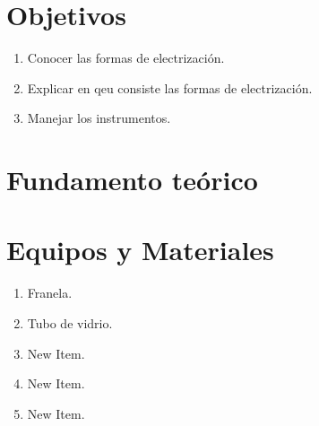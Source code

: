 \begin{center}
	\underline{\Large\scshape\bfseries \dytema}
\end{center}
\section{Objetivos}
\begin{enumerate}[label=\itemcirccz{azzul}{\arabic*},itemsep=2pt,partopsep=6pt]
	\item Conocer las formas de electrización.
	\item Explicar en qeu consiste las formas de electrización.
	\item Manejar los instrumentos.
\end{enumerate}

\section{Fundamento teórico}
\section{Equipos y Materiales}
\begin{enumerate}[label=\itemcirccz{azzul}{\alph*},itemsep=2pt,partopsep=6pt]
	\item Franela.
	\item Tubo de vidrio.
	\item {\color{morado01} New Item.}
	\item {\color{morado01} New Item.}
	\item {\color{morado01} New Item.}
\end{enumerate}

